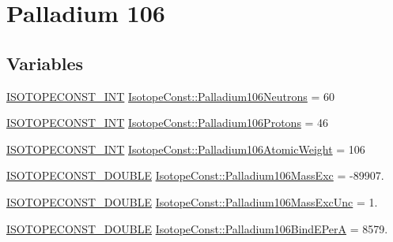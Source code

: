 \hypertarget{group___isotope_const-_palladium-_pd106}{}\section{Palladium 106}
\label{group___isotope_const-_palladium-_pd106}
\subsection*{Variables}
\begin{DoxyCompactItemize}
\item 
\mbox{\hyperlink{group___isotope_const-_macros_ga5f18360b3e99483a35c32d789e62621c}{I\+S\+O\+T\+O\+P\+E\+C\+O\+N\+S\+T\+\_\+\+I\+NT}} \mbox{\hyperlink{group___isotope_const-_palladium-_pd106_gaa19295ba9f09d0e40575ae2969acb3d3}{Isotope\+Const\+::\+Palladium106\+Neutrons}} = 60
\item 
\mbox{\hyperlink{group___isotope_const-_macros_ga5f18360b3e99483a35c32d789e62621c}{I\+S\+O\+T\+O\+P\+E\+C\+O\+N\+S\+T\+\_\+\+I\+NT}} \mbox{\hyperlink{group___isotope_const-_palladium-_pd106_gafbc214dda69d446f71e97bc07b8ced5a}{Isotope\+Const\+::\+Palladium106\+Protons}} = 46
\item 
\mbox{\hyperlink{group___isotope_const-_macros_ga5f18360b3e99483a35c32d789e62621c}{I\+S\+O\+T\+O\+P\+E\+C\+O\+N\+S\+T\+\_\+\+I\+NT}} \mbox{\hyperlink{group___isotope_const-_palladium-_pd106_ga1057c2ab3d3192bc9eb877bc3a1e205e}{Isotope\+Const\+::\+Palladium106\+Atomic\+Weight}} = 106
\item 
\mbox{\hyperlink{group___isotope_const-_macros_ga8f45a7272ce02c0b4c65c44636ed719a}{I\+S\+O\+T\+O\+P\+E\+C\+O\+N\+S\+T\+\_\+\+D\+O\+U\+B\+LE}} \mbox{\hyperlink{group___isotope_const-_palladium-_pd106_ga4603a46b9e6d3c71d1178c02a5b70002}{Isotope\+Const\+::\+Palladium106\+Mass\+Exc}} = -\/89907.
\item 
\mbox{\hyperlink{group___isotope_const-_macros_ga8f45a7272ce02c0b4c65c44636ed719a}{I\+S\+O\+T\+O\+P\+E\+C\+O\+N\+S\+T\+\_\+\+D\+O\+U\+B\+LE}} \mbox{\hyperlink{group___isotope_const-_palladium-_pd106_ga74fb19bc036f7cfdac9707e777ee86a9}{Isotope\+Const\+::\+Palladium106\+Mass\+Exc\+Unc}} = 1.
\item 
\mbox{\hyperlink{group___isotope_const-_macros_ga8f45a7272ce02c0b4c65c44636ed719a}{I\+S\+O\+T\+O\+P\+E\+C\+O\+N\+S\+T\+\_\+\+D\+O\+U\+B\+LE}} \mbox{\hyperlink{group___isotope_const-_palladium-_pd106_gae4c98c794afb72a0e4be837c2af6ba2d}{Isotope\+Const\+::\+Palladium106\+Bind\+E\+PerA}} = 8579.
\item 

\end{DoxyCompactItemize}
